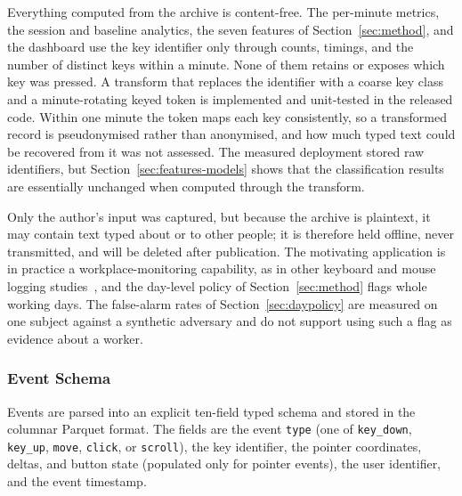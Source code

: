 \documentclass[sensors,article,submit,pdftex,oneauthor]{Definitions/mdpi}
\begin{document}
Everything computed from the archive is content-free. The per-minute metrics, the session and baseline analytics, the seven features of Section~\ref{sec:method}, and the dashboard use the key identifier only through counts, timings, and the number of distinct keys within a minute. None of them retains or exposes which key was pressed. A transform that replaces the identifier with a coarse key class and a minute-rotating keyed token is implemented and unit-tested in the released code. Within one minute the token maps each key consistently, so a transformed record is pseudonymised rather than anonymised, and how much typed text could be recovered from it was not assessed. The measured deployment stored raw identifiers, but Section~\ref{sec:features-models} shows that the classification results are essentially unchanged when computed through the transform.

Only the author's input was captured, but because the archive is plaintext, it may contain text typed about or to other people; it is therefore held offline, never transmitted, and will be deleted after publication. The motivating application is in practice a workplace-monitoring capability, as in other keyboard and mouse logging studies~\cite{awada2023productivity}, and the day-level policy of Section~\ref{sec:method} flags whole working days. The false-alarm rates of Section~\ref{sec:daypolicy} are measured on one subject against a synthetic adversary and do not support using such a flag as evidence about a worker.

\subsubsection{Event Schema}
Events are parsed into an explicit ten-field typed schema and stored in the columnar Parquet format. The fields are the event \texttt{type} (one of \texttt{key\_down}, \texttt{key\_up}, \texttt{move}, \texttt{click}, or \texttt{scroll}), the key identifier, the pointer coordinates, deltas, and button state (populated only for pointer events), the user identifier, and the event timestamp.
\end{document}
